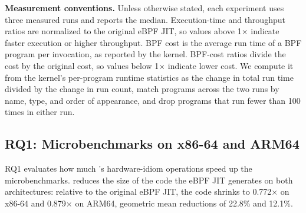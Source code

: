 \noindent\textbf{Measurement conventions.}
Unless otherwise stated, each experiment uses three measured runs and reports the median.
Execution-time and throughput ratios are normalized to the original eBPF JIT, so values above 1$\times$ indicate faster execution or higher throughput.
BPF cost is the average run time of a BPF program per invocation, as reported by the kernel. BPF-cost ratios divide the \lang cost by the original cost, so values below 1$\times$ indicate lower cost.
We compute it from the kernel's per-program runtime statistics as the change in total run time divided by the change in run count, match programs across the two runs by name, type, and order of appearance, and drop programs that run fewer than 100 times in either run.



\subsection{RQ1: Microbenchmarks on x86-64 and ARM64}
\label{subsec:micro_benchmark}



RQ1 evaluates how much \lang's hardware-idiom operations speed up the microbenchmarks.
\lang reduces the size of the code the eBPF JIT generates on both architectures: relative to the original eBPF JIT, the code shrinks to 0.772$\times$ on x86-64 and 0.879$\times$ on ARM64, geometric mean reductions of 22.8\% and 12.1\%.


